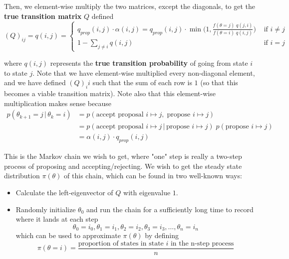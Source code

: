 \documentclass{article}
\begin{document}
  Then, we element-wise multiply the two matrices, except the diagonals, to get the \textbf{true transition matrix} $Q$ defined
  \begin{equation}
    (Q)_{ij} = q(i, j) = \begin{cases}
      q_{prop} (i, j) \cdot \alpha (i, j) = q_{prop}(i, j) \cdot \min\bigg(1, \frac{f(\theta = j) \; q(j, i)}{f(\theta = i) \; q(i, j)} \bigg) & \text{ if } i \neq j \\
      1 - \sum_{j \neq i} q(i, j) & \text{ if } i = j
    \end{cases}
  \end{equation}

  where $q(i, j)$ represents the \textbf{true transition probability} of going from state $i$ to state $j$. Note that we have element-wise multiplied every non-diagonal element, and we have defined $(Q)_ii$ such that the sum of each row is $1$ (so that this becomes a viable transition matrix). Note also that this element-wise multiplication makes sense because
  \begin{align*}
    p(\theta_{k+1} = j\,|\, \theta_k = i) & = p(\text{accept proposal }i \mapsto j, \; \text{propose } i \mapsto j) \\
    & = p(\text{accept proposal }i \mapsto j\,|\, \text{propose } i \mapsto j)\; p(\text{propose } i \mapsto j) \\
    & = \alpha(i, j) \cdot q_{prop} (i, j)
  \end{align*}

  This is the Markov chain we wish to get, where "one" step is really a two-step process of proposing and accepting/rejecting. We wish to get the steady state distribution $\pi(\theta)$ of this chain, which can be found in two well-known ways:
  \begin{itemize}
    \item Calculate the left-eigenvector of $Q$ with eigenvalue $1$.
    \item Randomly initialize $\theta_0$ and run the chain for a sufficiently long time to record where it lands at each step
    \begin{equation}
      \theta_0 = i_0, \theta_1 = i_1, \theta_2 = i_2, \theta_3 = i_3, \ldots, \theta_n = i_n
    \end{equation}
    which can be used to approximate $\pi(\theta)$ by defining
    \begin{equation}
      \pi(\theta = i) = \frac{\text{proportion of states in state } i \text{ in the n-step process}}{n}
    \end{equation}
  \end{itemize}
\end{document}
